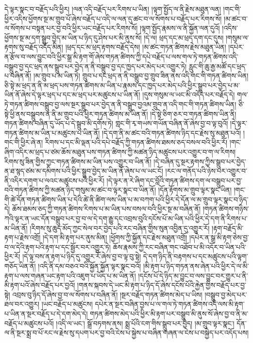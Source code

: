 དེ་ལྟར་སྣང་བ་བརྗོད་པའི་ཕྱིར། །ལན་འདི་བརྗོད་པར་རིགས་པ་ཡིན། །ལྟག་སྤྱོད་ལ་ནི་རྗེས་མཐུན་ལན། །གང་གི་ཕྱིར་འདིས་ཕྱོགས་སྔ་མ་གྲུབ་པོ་ཞེས་བརྗོད་པ་འདི་ལ་ལན་དུ་ཚང་བ་ལ་སོགས་པ་བརྗོད་པར་རིགས་སོ། །མ་ཚང་བ་ལ་སོགས་པ་བསྟན་པར་བྱ་བའི་ཕྱིར་ཡང་བརྗོད་པར་རིགས་སོ། །ལྟག་སྤྱོད་རྣམས་ལ་ནི་སྐྱོན་ལན་དུའོ། །འདིས་ཕྱོགས་སྔ་མ་དག་སྒྲུབ་བྱེད་མ་ཡིན་པ་ཉིད་དུ་ཤེས་པར་མི་ནུས་སོ། །དེ་ལ། ཕྲད་དང་མ་ཕྲད་དག་དང་དུས། །གསུམ་ལ་རྟགས་སུ་བརྗོད་འདོད་མིན། །ཕྲད་དང་མ་ཕྲད་རྟགས་བརྗོད་དེས། །མ་ཚང་གཏན་ཚིགས་རྗེས་མཐུན་ཡིན། །དཔེར་ན་རྩོལ་བ་ལས་བྱུང་བའི་ཕྱིར་སྒྲ་མི་རྟག་གོ་ཞེས་གཏན་ཚིགས་ཀྱི་དཔེ་བརྗོད་པ་ལས་གལ་ཏེ་གཏན་ཚིགས་འདི་བསྒྲུབ་བྱ་དང་ཕྲད་ནས་སྒྲུབ་པར་བྱེད་ན་ནི་བསྒྲུབ་བྱ་དང་ཁྱད་པར་མེད་པར་འགྱུར་ཏེ། རླུང་གི་ཆུ་རྒྱ་མཚོ་དང་ཕྲད་པ་བཞིན་ནོ། །མ་གྲུབ་པ་མ་ཡིན་ཏེ། གྲུབ་པ་དང་ཕྲད་ན་ནི་བསྒྲུབ་བྱ་གྲུབ་ཟིན་ནས་འདི་གང་གི་གཏན་ཚིགས་ཡིན། ཅི་སྟེ་མ་ཕྲད་ན་ནི་མ་ཕྲད་པས་གཏན་ཚིགས་མ་ཡིན་པ་རྣམས་དང་ཁྱད་པར་མེད་པའི་ཕྱིར་སྒྲུབ་པར་བྱེད་པ་མ་ཡིན་ནོ་ཞེས་དེ་ལྟར་ཕྲད་པ་དང་མ་ཕྲད་པར་མཚུངས་པ་ཡིན་ནོ། །དུས་གསུམ་ལ་ཡང་མི་འདོད་པར་བརྗོད་དེ། གལ་ཏེ་གཏན་ཚིགས་བསྒྲུབ་བྱ་ལས་སྔར་སྒྲུབ་པར་བྱེད་ན་ནི་བསྒྲུབ་བྱའམ་གྲུབ་ན་འདི་གང་གི་གཏན་ཚིགས་ཡིན། ཅི་སྟེ་ཕྱི་ནས་བསྒྲུབས་ན་ནི་མ་གྲུབ་པའི་ཕྱིར་གཏན་ཚིགས་མ་ཡིན་ནོ། །དེ་སྟེ་ཅིག་ཅར་བ་གཏན་ཚིགས་ཡིན་ནི། གཏན་ཚིགས་བཞིན་དུ་ཡོད་པ་དེ་སྒྲུབ་མི་དགོས་ཏེ། གླང་གི་རྭ་གཡས་གཡོན་བཞིན་ནོ་ཞེས་བྱ་བ་ལྟ་བུའོ། །དེ་ལྟར་གཏན་ཚིགས་མ་ཡིན་པ་མཚུངས་པ་ཡིན་ནོ། །དེ་དག་ནི་མ་ཚང་བའི་གཏན་ཚིགས་ཉིད་དང་རྗེས་སུ་མཐུན་པའོ། །གང་གི་ཕྱིར་ཞེ་ན། རིགས་པ་དང་མི་ལྡན་པའི་དཔེ་བརྗོད་ཀྱི་གཏན་ཚིགས་ཐམས་ཅད་བསལ་བའི་ཕྱིར་རོ། །གང་ཞིག་འདིར་མ་ཕྲད་པ་ཙམ་ཆོས་མཐུན་པས་གཏན་ཚིགས་ཀྱི་མཚན་ཉིད་མཚུངས་པར་འགྱུར་བ་ག་ལ་རིགས། རིགས་སུ་ཟིན་གྱིས་ཀྱང་གཏན་ཚིགས་མ་ཡིན་པས་འགྱུར་བ་ཡིན་ནོ། །དེ་བཞིན་དུ་སྔར་རྟགས་ཀྱིས་སྒྲུབ་པར་བྱེད་ན་ཐ་སྙད་ཙམ་མ་དམིགས་པའི་ཕྱིར་སྒྲུབ་བྱེད་མ་ཡིན་ནོ་ཞེས་པ་ལ་ཡང་ངོ། །རང་ལ་གནོད་པའི་ཉེས་པར་འགྱུར་བ་ནི་འདིར་དགག་པ་ལའང་མཚུངས་པའི་ཕྱིར་རོ། །དེ་ལྟར་ན་རེ་ཞིག་དང་བློའི་གཏན་ཚིགས་དག་ལ་བསྒྲུབ་པར་བྱ་བའི་གཏན་ཚིགས་ཀྱི་མཚན་ཉིད་གསུམ་མ་ཚང་བ་ལྟར་སྣང་བ་ཡིན་ནོ། །དོན་རྟོགས་མ་གྲུབ་ལྟར་སྣང་ཡིན། །གང་གི་ཚེ་དོན་གཏན་ཚིགས་ཡིན་པ་དེའི་ཚེ་ནི་ཚིག་ལས་ཡིན་པ་མ་བཀག་པའི་ཕྱིར་དེ་དོན་ལ་མ་གྲུབ་ལྟར་སྣང་བ་ཉིད་དེ། ཆོས་ཐམས་ཅད་ཀྱི་གཏན་ཚིགས་རིགས་པ་མ་ཡིན་པས་བསལ་བའི་ཕྱིར་སྔ་མ་བཞིན་ནོ། །གཏན་ཚིགས་གཉིས་ཀའི་ལྟར་ན་ཡང་དོན་བསྒྲུབ་པར་བྱ་བ་ལ་དེ་དག་རྒྱུ་དང་འབྲས་བུའི་དངོས་པོ་མ་ཡིན་པའི་ཕྱིར་དེ་དག་ནི་རིགས་པ་མ་ཡིན་ནོ། །རིགས་སུ་ཆུད་མོད་ཀྱང་སེལ་བར་བྱེད་པའི་རང་བཞིན་གྱིས་སུན་འབྱིན་དུ་འགྱུར་རོ། །རྟག་བརྗོད་མི་རྟག་པ་རྗེས་འགྲོ། །དེ་དག་མི་རྟག་པར་ནུས་མིན། །ཕྱོགས་ཀྱི་སྐྱོན་དང་རྗེས་མཐུན་འགྲོ། །དཔེར་ན་སྒྲ་མི་རྟག་ཅེས་བྱ་བ་ལ་དེའི་རྟག་པའི་རྟག་པ་དང་སྦྱོར་བར་འགྱུར་ཏེ། ཆོས་རྣམས་ཀྱི་རང་བཞིན་གང་འཐོབ་པ་མི་འདོར་བ་ཡིན་པའི་ཕྱིར་རོ། །དེ་ལྟ་བས་ན་རྟག་པ་ཉིད་དུ་འགྱུར་རོ་ཞེས་བྱ་བ་ལྟ་བུ་སྟེ། དེ་དག་ཉིད་ནི་བརྟགས་པ་དང་མཚུངས་པའི་ལྟག་གཅོད་ཡིན་ནོ། །འདི་ནི་དམ་བཅའ་བའི་སྐྱོན་སྐྱོན་ལྟར་སྣང་བའོ། །མི་རྟག་པ་ཉིད་གཏན་ནས་ཞེན་པའི་ཕྱིར་དེ་ལ་མི་རྟག་པ་ལས་གཞན་ཡང་རྟག་པའི་འཇུག་པ་ཡོད་པ་མ་ཡིན་ནོ། །དངོས་པོ་དེ་ཉིད་མ་བྱུང་བ་ལས་བྱུང་བར་གྱུར་པ་ནི་མི་རྟག་པའོ་ཞེས་བརྗོད་པར་བྱའོ། །གནས་སྐབས་དེ་ཡང་མི་རྟག་པ་ཉིད་དོ་ཞེས་དངོས་པོའི་རྐྱེན་གྱིས་བརྗོད་པར་བྱ་སྟེ། འབྲས་བུ་ཉིད་དོ་ཞེས་བྱ་བ་ལ་སོགས་པ་བཞིན་ནོ། །སྔར་བརྗོད་གཏན་ཚིགས་མེད་པ་ཡིས། །བསྒྲུབ་བྱ་མེད་པར་ཐལ་བར་འགྱུར། །ཡང་བརྗོད་པ་མཚུངས། དཔེར་ན་སྔར་བཞིན་བྱས་པ་ལ་གལ་ཏེ་གཏན་ཚིགས་འདི་ལས་མི་རྟག་པ་ཡིན་ན་སྔར་བརྗོད་པ་དེ་དག་མེད་དེ། གཏན་ཚིགས་མེད་པའི་ཕྱིར་མི་རྟག་པར་བསྒྲུབ་མི་ནུས་སོ་ཞེས་བྱ་བ་ནི་མ་བརྗོད་པ་མཚུངས་པའོ། །འདི་ལ་ཡང་། སྒྲོ་བཏགས་ནས། སྨྲ་པོའི་ངག་གིས་སྒྲུབ་པར་བྱེད། །མ་གྲུབ་ལྟར་སྣང་། དོན་ལ་ནི་སྔར་སྨྲ་བ་པོ་རང་ལ་རྗེས་སུ་དཔག་པར་བྱ་བའི་ངེས་པ་སྐྱེས་པ་བཞིན་གཞན་ལ་ངེས་པ་བསྐྱེད་པར་འདོད་པས། 